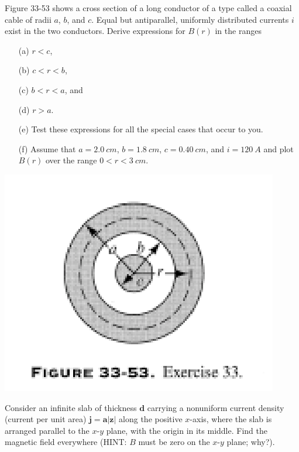 \documentclass[12pt,letterpaper,boxed,cm]{hmcpset}
\begin{document}

\begin{problem}[33-P8]
	Figure 33-53 shows a cross section of a long conductor of a type called a coaxial cable of radii $a$, $b$, and $c$. Equal but antiparallel, uniformly distributed currents $i$ exist in the two conductors. Derive expressions for $B(r)$ in the ranges
	\begin{enumerate}
		\item[(a)] $r < c$, 
		\item[(b)] $c < r < b$, 
		\item[(c)] $b < r < a$,  and
		\item[(d)] $r > a$.
		\item[(e)] Test these expressions for all the special cases that occur to you.
		\item[(f)] Assume that $a = \SI{2.0}{cm}$, $b = \SI{1.8}{cm}$, $c = \SI{0.40}{cm}$, and $i = \SI{120}{A}$ and plot $B(r)$ over the range $0 < r < \SI{3}{cm}$.
	\end{enumerate}
	\begin{center}
		\includegraphics[scale=0.7]{01.png}	
	\end{center}
\end{problem}
\begin{solution}	
\end{solution}
\newpage

\begin{problem}[33-E33]	
Consider an infinite slab of thickness $\mathbf{d}$ carrying a nonuniform current density (current per unit area) $\mathbf{j} = \mathbf{a} |\mathbf{z}|$ along the positive $x$-axis, where the slab is arranged parallel to the $x$-$y$ plane, with the origin in its middle. Find the magnetic field everywhere (HINT: $B$ must be zero on the $x$-$y$ plane; why?).
\end{problem}
\begin{solution}
\end{solution}
\newpage
\end{document}
